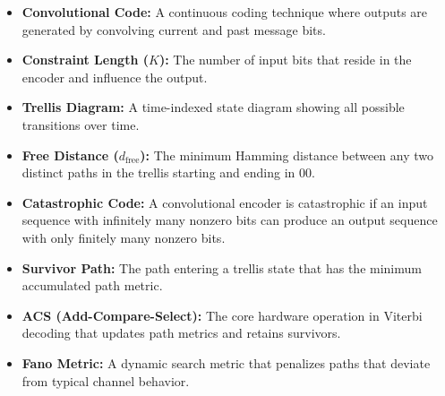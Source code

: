 \documentclass[12pt,a4paper]{article}
\begin{document}
\vspace{6pt}

\begin{tcolorbox}[defbox, title={\textbf{One-Line Definitions}}]
\begin{itemize}[leftmargin=*, itemsep=3.5pt, topsep=0pt]
  \item \textbf{Convolutional Code:} A continuous coding technique where outputs are generated by convolving current and past message bits.
  \item \textbf{Constraint Length ($K$):} The number of input bits that reside in the encoder and influence the output.
  \item \textbf{Trellis Diagram:} A time-indexed state diagram showing all possible transitions over time.
  \item \textbf{Free Distance ($d_{\text{free}}$):} The minimum Hamming distance between any two distinct paths in the trellis starting and ending in $00$.
  \item \textbf{Catastrophic Code:} A convolutional encoder is catastrophic if an input sequence with infinitely many nonzero bits can produce an output sequence with only finitely many nonzero bits.
  \item \textbf{Survivor Path:} The path entering a trellis state that has the minimum accumulated path metric.
  \item \textbf{ACS (Add-Compare-Select):} The core hardware operation in Viterbi decoding that updates path metrics and retains survivors.
  \item \textbf{Fano Metric:} A dynamic search metric that penalizes paths that deviate from typical channel behavior.
\end{itemize}
\end{tcolorbox}

\newpage
\end{document}
